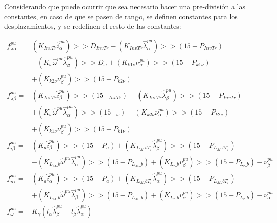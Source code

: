 \documentclass{article}
\begin{document}
        Considerando que puede ocurrir que sea necesario hacer una pre-división a las constantes, en caso de que se pasen de rango, se definen constantes para los desplazamientos, y se redefinen el resto de las constantes:
 
         \begin{equation}
            \begin{aligned}
                f_{\lambda\alpha}^{pu} =& \left( K_{InvTr}   \hat{i}_\alpha^{pu} \right) >> D_{InvTr} 
                    -  \left(K_{InvTr} \hat{\lambda}_\alpha^{pu}  \right) >> (15-P_{InvTr}) \\
                    &- \left( K_{\omega} \hat{\omega}^{pu} \hat{\lambda}_\beta^{pu} \right)>> D_{\omega} 
                    +  \left( K_{k1\nu} \nu_\alpha^{pu} \right)>> (15-P_{k1\nu}) \\
                    & +  \left( K_{k2\nu}\nu_\beta^{pu} \right) >> (15-P_{k2\nu})\\
                f_{\lambda\beta}^{pu} =& \left( K_{InvTr} \hat{i}_\beta^{pu} \right) >> (15-_{InvTr})
                    -  \left( K_{InvTr} \hat{\lambda}_\beta^{pu}  \right) >> (15-P_{InvTr}) \\
                    & + \left( K_{\omega} \hat{\omega}^{pu} \hat{\lambda}_\alpha^{pu} \right) >> (15-_{\omega})
                    - \left( K_{k2\nu} \nu_\alpha^{pu} \right) >> (15-P_{k2\nu}) \\
                    & + \left( K_{k1\nu} \nu_\beta^{pu} \right) >> (15-P_{k1\nu}) \\
                f_{i\beta}^{pu} = &  
                    \left(K_a \hat{i}_\beta^{pu}\right) >> (15-P_a)
                    + \left( K_{L_M\_bT_r}  \hat{\lambda}_\beta^{pu}  \right)  >> (15-P_{L_M\_bT_r}) \\
                    & - \left( K_{L_M\_b}  \hat{\omega}^{pu}  \hat{\lambda}_\alpha^{pu}\right)  >> (15-P_{L_M\_b})
                    + \left( K_{L_r\_b}  v_\beta^{pu} \right) >> (15-P_{L_r\_b})
                     -    \nu_\beta^{pu}   \\
                f_{i\alpha}^{pu} = & \left( K_a \hat{i}_\alpha^{pu}        \right) >> (15-P_a)
                   + \left( K_{L_M\_bT_r} \hat{\lambda}_\alpha^{pu}  \right)  >> (15-P_{L_M\_bT_r}) \\
                   & + \left(  K_{L_M\_b} \hat{\omega}^{pu} \hat{\lambda}_\beta^{pu}   \right)>> (15-P_{L_M\_b})
                   + \left( K_{L_r\_b} v_\alpha^{pu} \right) >> (15-P_{L_r\_b} )
                   -  \nu_\alpha^{pu}  \\
                f_\omega^{pu} = & K_\gamma 
                    \left( 
                        l_\alpha \hat{\lambda}_\beta^{pu} 
                        - l_\beta \hat{\lambda}_\alpha^{pu}  
                    \right) 
            \end{aligned}
        \end{equation}
\end{document}
